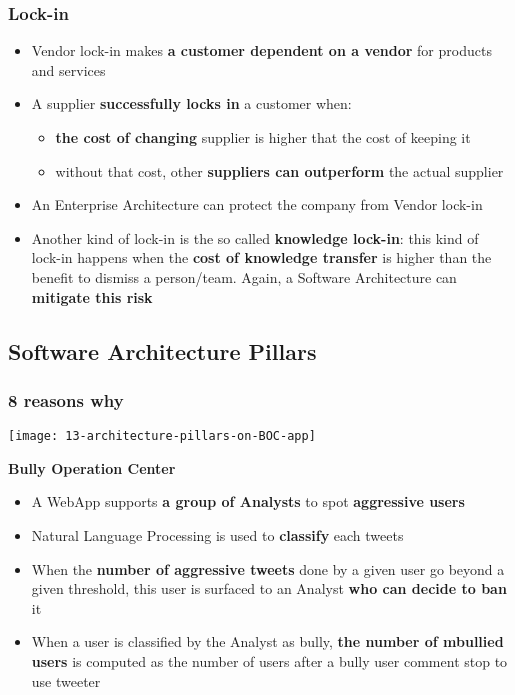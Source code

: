 \subsubsection{Lock-in}
\begin{itemize}
	\item Vendor lock-in makes \textbf{a customer dependent on a vendor} for products and
services
	\item A supplier \textbf{successfully locks in} a customer when:
	\begin{itemize}
		\item \textbf{the cost of changing} supplier is higher that the cost of keeping it
		\item without that cost, other \textbf{suppliers can outperform} the actual supplier
	\end{itemize}
	\item An Enterprise Architecture can protect the company from Vendor lock-in
	\item Another kind of lock-in is the so called \textbf{knowledge lock-in}: this kind of lock-in happens when the \textbf{cost of knowledge transfer} is higher than the benefit to dismiss a person/team. Again, a Software Architecture can \textbf{mitigate this risk}
\end{itemize}

\subsection{Software Architecture Pillars}

\subsubsection{8 reasons why}

\begin{center}
\texttt{[image: 13-architecture-pillars-on-BOC-app]}
\end{center}

\textbf{Bully Operation Center}
\begin{itemize}
	\item A WebApp supports \textbf{a group of Analysts} to spot \textbf{aggressive users}
	\item Natural Language Processing is used to \textbf{classify} each tweets
	\item When the \textbf{number of aggressive tweets} done by a given user go beyond a given threshold, this user is surfaced to an Analyst \textbf{who can decide to ban} it
	\item When a user is classified by the Analyst as bully, \textbf{the number of mbullied users} is computed as the number of users after a bully user comment stop to use tweeter
\end{itemize}

